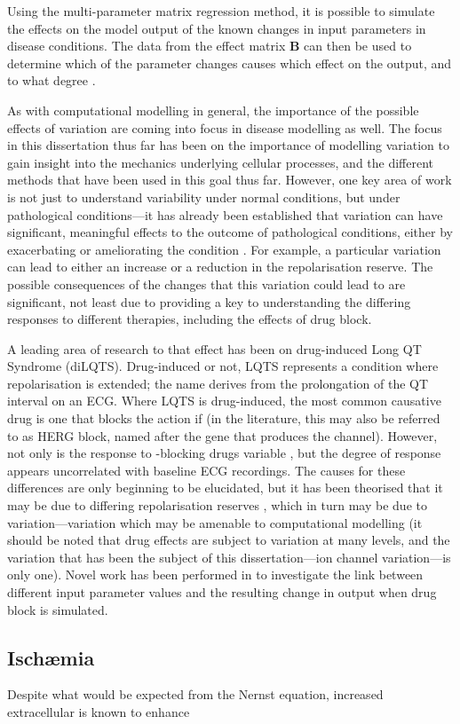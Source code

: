 \documentclass[../thesis-main.tex]{subfiles}
\begin{document}
 Using the multi-parameter matrix regression method, it is possible to simulate the effects on the model output of the known changes in input parameters in disease conditions. The data from the effect matrix $\mathbf{B}$ can then be used to determine which of the parameter changes causes which effect on the output, and to what degree \citep{Sarkar2012}.
 
 As with computational modelling in general, the importance of the possible effects of variation are coming into focus in disease modelling as well. The focus in this dissertation thus far has been on the importance of modelling variation to gain insight into the mechanics underlying cellular processes, and the different methods that have been used in this goal thus far. However, one key area of work is not just to understand variability under normal conditions, but under pathological conditions---it has already been established that variation can have significant, meaningful effects to the outcome of pathological conditions, either by exacerbating or ameliorating the condition \citep{Sarkar2012, John2012}. For example, a particular variation can lead to either an increase or a reduction in the repolarisation reserve. The possible consequences of the changes that this variation could lead to are significant, not least due to providing a key to understanding the differing responses to different therapies, including the effects of drug block.
 
 A leading area of research to that effect has been on drug-induced Long QT Syndrome (diLQTS). Drug-induced or not, LQTS represents a condition where repolarisation is extended; the name derives from the prolongation of the QT interval on an ECG. Where LQTS is drug-induced, the most common causative drug is one that blocks the action if \ikr{} (in the literature, this may also be referred to as HERG block, named after the gene that produces the channel). However, not only is the response to \ikr{}-blocking drugs variable \citep{Kannankeril2010}, but the degree of response appears uncorrelated with baseline ECG recordings. The causes for these differences are only beginning to be elucidated, but it has been theorised that it may be due to differing repolarisation reserves \citep{Varro2011}, which in turn may be due to variation---variation which may be amenable to computational modelling (it should be noted that drug effects are subject to variation at many levels, and the variation that has been the subject of this dissertation---ion channel variation---is only one). Novel work has been performed in \citet{Sarkar2011} to investigate the link between different input parameter values and the resulting change in output when drug block is simulated.
 
 \subsection{Isch\ae mia}
 \label{subsec:ischaemia}
 Despite what would be expected from the Nernst equation, increased extracellular \K{} is known to enhance \ikr{} \citep{Sanguinetti1992, Yang1997}
 
\end{document}
